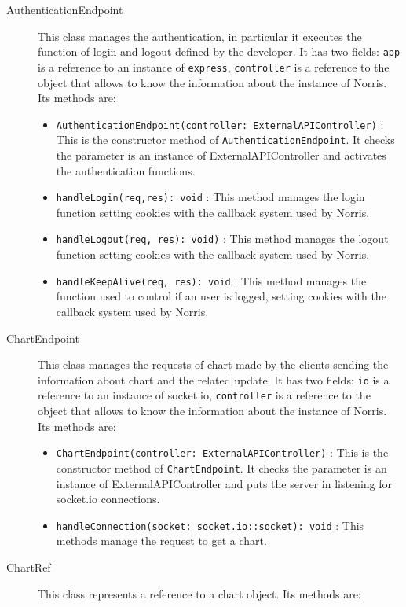 \begin{description}
	\item[AuthenticationEndpoint] This class manages the authentication, in particular it executes the function of login and logout defined by the developer. It has two fields: \texttt{app} is a reference to an instance of \texttt{express}, \texttt{controller} is a reference to the object that allows to know the information about the instance of Norris. Its methods are:
		\begin{itemize}
			\item \texttt{AuthenticationEndpoint(controller: ExternalAPIController)} : This is the constructor method of \texttt{AuthenticationEndpoint}. It checks the parameter is an instance of ExternalAPIController and activates the authentication functions.
			\item \texttt{handleLogin(req,res): void} : This method manages the login function setting cookies with the callback system used by Norris.
			\item \texttt{handleLogout(req, res): void)} : This method manages the logout function setting cookies with the callback system used by Norris.
			\item \texttt{handleKeepAlive(req, res): void} : This method manages the function used to control if an user is logged, setting cookies with the callback system used by Norris.
		\end{itemize} 
	\item[ChartEndpoint] This class manages the requests of chart made by the clients sending the information about chart and the related update. It has two fields:  \texttt{io} is a reference to an instance of socket.io, \texttt{controller} is a reference to the object that allows to know the information about the instance of Norris. Its methods are:
	\begin{itemize}
			\item \texttt{ChartEndpoint(controller: ExternalAPIController)} : This is the constructor method of \texttt{ChartEndpoint}. It checks the parameter is an instance of ExternalAPIController and puts the server in listening for socket.io connections.
			\item \texttt{handleConnection(socket: socket.io::socket): void} : This methods manage the request to get a chart. %
	\end{itemize}
	\item[ChartRef]	This class represents a reference to a chart object. Its methods are:

\end{description}
